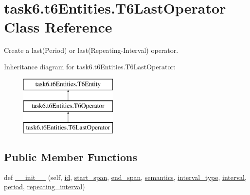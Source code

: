 \hypertarget{classtask6_1_1t6Entities_1_1T6LastOperator}{}\section{task6.\+t6\+Entities.\+T6\+Last\+Operator Class Reference}
\label{classtask6_1_1t6Entities_1_1T6LastOperator}


Create a last(\+Period) or last(Repeating-\/\+Interval) operator.  


Inheritance diagram for task6.\+t6\+Entities.\+T6\+Last\+Operator\+:\begin{figure}[H]
\begin{center}
\leavevmode
\includegraphics[height=3.000000cm]{classtask6_1_1t6Entities_1_1T6LastOperator}
\end{center}
\end{figure}
\subsection*{Public Member Functions}
\begin{DoxyCompactItemize}
\item 
def \hyperlink{classtask6_1_1t6Entities_1_1T6LastOperator_a16b9eca4b13c34d4615c7a654d30b501}{\+\_\+\+\_\+init\+\_\+\+\_\+} (self, \hyperlink{classtask6_1_1t6Entities_1_1T6Entity_afeeced8134bb3ebe0cfecc64d0ab46a4}{id}, \hyperlink{classtask6_1_1t6Entities_1_1T6Entity_a52779e9af8864dc98e8b02fc5b9b041a}{start\+\_\+span}, \hyperlink{classtask6_1_1t6Entities_1_1T6Entity_aeb402200b156cd9562c5111dfe777b98}{end\+\_\+span}, \hyperlink{classtask6_1_1t6Entities_1_1T6LastOperator_ace165f371e06ffdd35e81589f7e3ad4c}{semantics}, \hyperlink{classtask6_1_1t6Entities_1_1T6LastOperator_a5aeed327adbf129c1493d5782bd6afd4}{interval\+\_\+type}, \hyperlink{classtask6_1_1t6Entities_1_1T6LastOperator_aca10c8da0b6eea3185f66f103dca0a29}{interval}, \hyperlink{classtask6_1_1t6Entities_1_1T6LastOperator_ac165233979c84dfa138d76b67d171b1a}{period}, \hyperlink{classtask6_1_1t6Entities_1_1T6LastOperator_ab58d042c2aeff54eb56b7298375cb15b}{repeating\+\_\+interval})
\end{DoxyCompactItemize}
